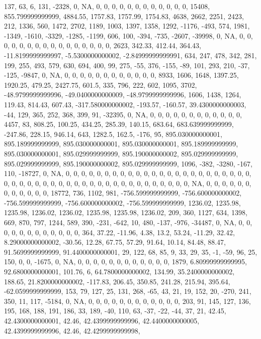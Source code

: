 \documentclass[
]{article}
\begin{document}
137, 63, 6, 131, -2328, 0, NA, 0, 0, 0, 0, 0, 0, 0, 0, 0, 0, 0, 0,
15408, 855.799999999999, 4884.55, 1757.83, 1757.99, 1754.83, 4638, 2662,
2251, 2423, 212, 1336, 560, 1472, 2702, 1189, 1003, 1397, 1358, 1292,
-1176, -493, 574, 1981, -1349, -1610, -3329, -1285, -1199, 606, 100,
-394, -735, -2607, -39998, 0, NA, 0, 0, 0, 0, 0, 0, 0, 0, 0, 0, 0, 0, 0,
0, 0, 0, 2623, 342.33, 412.44, 364.43, -11.8199999999997,
-5.5300000000002, -2.84999999999991, 634, 247, 478, 342, 281, 199, 255,
493, 579, 630, 694, 400, 99, 275, -55, 376, -155, -89, 101, 293, 210,
-37, -125, -9847, 0, NA, 0, 0, 0, 0, 0, 0, 0, 0, 0, 0, 0, 0, 8933, 1606,
1648, 1397.25, 1920.25, 479.25, 2427.75, 601.5, 335, 796, 222, 602,
1095, 3702, -48.9799999999996, -49.0400000000009, -48.9799999999996,
1606, 1438, 1264, 119.43, 814.43, 607.43, -317.580000000002, -193.57,
-160.57, 39.4300000000003, -44, 129, 365, 252, 368, 399, 91, -32395, 0,
NA, 0, 0, 0, 0, 0, 0, 0, 0, 0, 0, 0, 0, 4457, 83, 808.25, 100.25,
434.25, 285.39, 140.15, 683.64, 683.639999999999, -247.86, 228.15,
946.14, 643, 1282.5, 162.5, -176, 95, 895.030000000001,
895.189999999999, 895.030000000001, 895.030000000001, 895.189999999999,
895.030000000001, 895.029999999999, 895.190000000002, 895.029999999999,
895.029999999999, 895.190000000002, 895.029999999999, 1096, -382, -3280,
-167, 110, -18727, 0, NA, 0, 0, 0, 0, 0, 0, 0, 0, 0, 0, 0, 0, 0, 0, 0,
0, 0, 0, 0, 0, 0, 0, 0, 0, 0, 0, 0, 0, 0, 0, 0, 0, 0, 0, 0, 0, 0, 0, 0,
0, 0, 0, 0, 0, 0, 0, 0, 0, NA, 0, 0, 0, 0, 0, 0, 0, 0, 0, 0, 0, 0,
18772, 736, 1102, 981, -756.599999999999, -756.600000000002,
-756.599999999999, -756.600000000002, -756.599999999999, 1236.02,
1235.98, 1235.98, 1236.02, 1236.02, 1235.98, 1235.98, 1236.02, 209, 360,
1127, 634, 1398, 669, 870, 797, 1244, 589, 390, -231, -642, 10, 480,
-137, -976, -34487, 0, NA, 0, 0, 0, 0, 0, 0, 0, 0, 0, 0, 0, 0, 364,
37.22, -11.96, 4.38, 13.2, 53.24, -11.29, 32.42, 8.29000000000002,
-30.56, 12.28, 67.75, 57.29, 91.64, 10.14, 84.48, 88.47,
91.5699999999999, 91.4400000000001, 29, 122, 68, 85, 9, 33, 29, 35, -1,
-59, 96, 25, 150, 0, 0, -1675, 0, NA, 0, 0, 0, 0, 0, 0, 0, 0, 0, 0, 0,
0, 1879, 6.80999999999995, 92.6800000000001, 101.76, 6,
64.7800000000002, 134.99, 35.2400000000002, 188.65, 21.8200000000002,
-117.83, 206.45, 350.85, 241.28, 215.94, 395.64, -62.0599999999999, 153,
79, 127, 25, 131, 268, -65, 43, 21, 19, 152, 20, -270, 241, 350, 11,
117, -5184, 0, NA, 0, 0, 0, 0, 0, 0, 0, 0, 0, 0, 0, 0, 203, 91, 145,
127, 136, 195, 168, 188, 191, 186, 33, 189, -40, 110, 63, -37, -22, -44,
37, 21, 42.45, 42.4300000000001, 42.46, 42.4399999999996,
42.4400000000005, 42.4399999999996, 42.46, 42.4299999999998,
\end{document}
